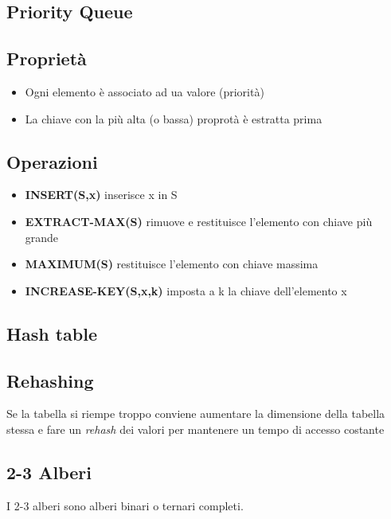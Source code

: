 \documentclass{article}
\begin{document}
\subsection{Priority Queue}
\subsection*{Proprietà}
\begin{itemize}
  \item Ogni elemento è associato ad ua valore (priorità)
  \item La chiave con la più alta (o bassa) proprotà è estratta prima
\end{itemize}
\subsection*{Operazioni}
\begin{itemize}
  \item \textbf{INSERT(S,x)} inserisce x in S
  \item \textbf{EXTRACT-MAX(S)} rimuove e restituisce l'elemento con chiave più grande
  \item \textbf{MAXIMUM(S)} restituisce l'elemento con chiave massima
  \item \textbf{INCREASE-KEY(S,x,k)} imposta a k la chiave dell'elemento x
\end{itemize}
\pagebreak

\subsection{Hash table}
\subsection*{Rehashing}
Se la tabella si riempe troppo conviene aumentare la dimensione della tabella stessa e fare un \emph{rehash} dei valori per mantenere un tempo di accesso costante
\pagebreak

\subsection{2-3 Alberi}
I 2-3 alberi sono alberi binari o ternari completi.
\end{document}
